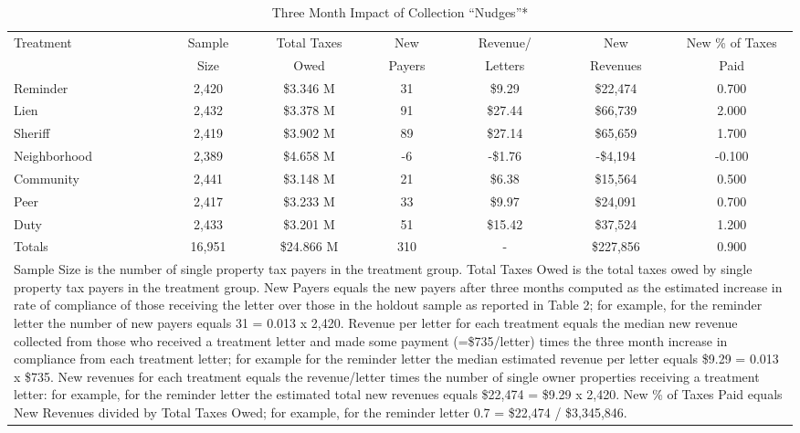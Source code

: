 \documentclass[12pt]{article}
\begin{document}
\begin{table}[htbp]
\centering
\caption{Three Month Impact of Collection ``Nudges''*}
\label{sh_rev}
\begin{tabular}{lcccccc}
  \hline
Treatment & Sample & Total Taxes & New & Revenue/ & New & New \% of Taxes \\
 & Size & Owed & Payers & Letters & Revenues & Paid \\
  \hline
Reminder & 2,420 & \$3.346 M & 31 & \$9.29 & \$22,474 & 0.700 \\
  Lien & 2,432 & \$3.378 M & 91 & \$27.44 & \$66,739 & 2.000 \\
  Sheriff & 2,419 & \$3.902 M & 89 & \$27.14 & \$65,659 & 1.700 \\
  Neighborhood & 2,389 & \$4.658 M & -6 & -\$1.76 & -\$4,194 & -0.100 \\
  Community & 2,441 & \$3.148 M & 21 & \$6.38 & \$15,564 & 0.500 \\
  Peer & 2,417 & \$3.233 M & 33 & \$9.97 & \$24,091 & 0.700 \\
  Duty & 2,433 & \$3.201 M & 51 & \$15.42 & \$37,524 & 1.200 \\
   \hline
Totals & 16,951 & \$24.866 M & 310 & - & \$227,856 & 0.900 \\
   \hline
\multicolumn{7}{p{1\textwidth}}{\scriptsize* Sample Size is the number of single property tax payers in the treatment group.  Total Taxes Owed is the total taxes owed by single property tax payers in the treatment group. New Payers equals the new payers after three months computed as the estimated increase in rate of compliance of those receiving the letter over those in the holdout sample as reported in Table 2; for example, for the reminder letter the number of new payers equals 31 = 0.013 x 2,420.  Revenue per letter for each treatment equals the median new revenue collected from those who received a treatment letter and made some payment (=\$735/letter) times the three month increase in compliance from each treatment letter; for example for the reminder letter the median estimated revenue per letter equals \$9.29 = 0.013 x \$735.  New revenues for each treatment equals the revenue/letter times the number of single owner properties receiving a treatment letter: for example, for the reminder letter the estimated total new revenues equals \$22,474 = \$9.29 x 2,420.  New \% of Taxes Paid equals New Revenues divided by Total Taxes Owed; for example, for the reminder letter 0.7 = \$22,474 / \$3,345,846.}
\end{tabular}
\end{table}
\end{document}

